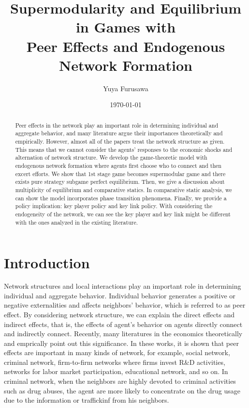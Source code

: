 \documentclass[12pt]{article}
\theoremstyle{definition}
\begin{document}
\title{Supermodularity and Equilibrium in Games with \\ Peer Effects and Endogenous Network Formation}

\author{Yuya Furusawa}

\date{\today}

\maketitle

\begin{abstract}
Peer effects in the network play an important role in determining individual and aggregate behavior, and many literature argue their importances theoretically and empirically.
However, almost all of the papers treat the network structure as given.
This means that we cannot consider the agents' responses to the economic shocks and alternation of network structure.
We develop the game-theoretic model with endogenous network formation where agents first choose who to connect and then excert efforts.
We show that 1st stage game becomes supermodular game and there exists pure strategy subgame perfect equilibrium.
Then, we give a discussion about multiplicity of equilibrium and comparative statics.
In comparative static analysis, we can show the model incorporates phase transition phenomena.
Finally, we provide a policy implication: key player policy and key link policy.
With considering the endogeneity of the network, we can see the key player and key link might be different with the ones analyzed in the existing literature.
\end{abstract}


\section{Introduction}

Network structures and local interactions play an important role in determining individual and aggregate behavior.
Individual behavior generates a positive or negative externalities and affects neighbors' behavior, which is referred to as peer effect.
By considering network structure, we can explain the direct effects and indirect effects, that is, the effects of agent's behavior on agents directly connect and indirectly connect.
Recently, many literatures in the economics theoretically and emprically point out this significance.
In these works, it is shown that peer effects are important in many kinds of network, for example, social network, criminal network, firm-to-firm networks where firms invest R\&D activities, networks for labor market participation, educational network, and so on.
In criminal network, when the neighbors are highly devoted to criminal activities such as drug abuses, the agent are more likely to concentrate on the drug usage due to the information or traffickinf from his neighbors.
\end{document}
